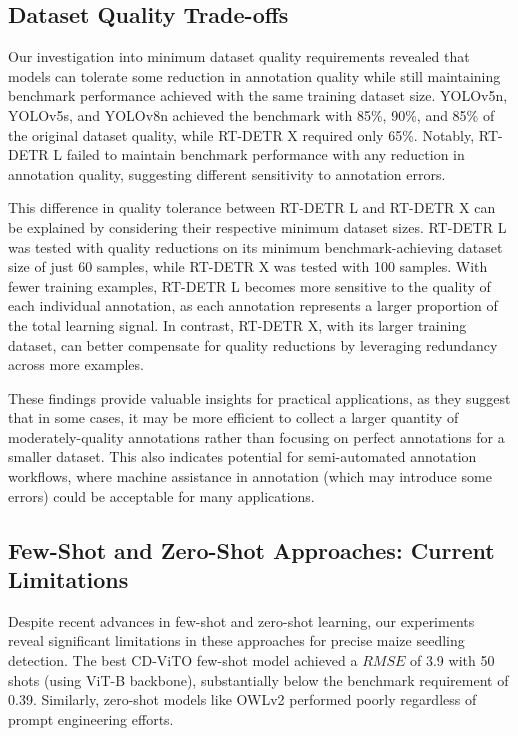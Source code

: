 \documentclass[12pt,a4paper,oneside]{report}
\begin{document}
\subsection{Dataset Quality Trade-offs}
Our investigation into minimum dataset quality requirements revealed that models can tolerate some reduction 
in annotation quality while still maintaining benchmark performance achieved with the
same training dataset size. YOLOv5n, YOLOv5s, and YOLOv8n achieved 
the benchmark with 85\%, 90\%, and 85\% of the original dataset quality, while RT-DETR X required 
only 65\%. Notably, RT-DETR L failed to maintain benchmark performance with any reduction in annotation quality, 
suggesting different sensitivity to annotation errors.

This difference in quality tolerance between RT-DETR L and RT-DETR X can be explained by considering their 
respective minimum dataset sizes. RT-DETR L was tested with quality reductions on its minimum benchmark-achieving 
dataset size of just 60 samples, while RT-DETR X was tested with 100 samples. With fewer training examples, 
RT-DETR L becomes more sensitive to the quality of each individual annotation, as each annotation represents 
a larger proportion of the total learning signal. In contrast, RT-DETR X, with its larger training dataset, 
can better compensate for quality reductions by leveraging redundancy across more examples.

These findings provide valuable insights for practical applications, as they suggest that in some 
cases, it may be more efficient to collect a larger quantity of moderately-quality annotations 
rather than focusing on perfect annotations for a smaller dataset. This also indicates potential 
for semi-automated annotation workflows, where machine assistance in annotation (which may introduce 
some errors) could be acceptable for many applications.

\subsection{Few-Shot and Zero-Shot Approaches: Current Limitations}
Despite recent advances in few-shot and zero-shot learning, our experiments reveal significant 
limitations in these approaches for precise maize seedling detection. The best CD-ViTO few-shot 
model achieved a $RMSE$ of 3.9 with 50 shots (using ViT-B backbone), substantially below the benchmark 
requirement of 0.39. Similarly, zero-shot models like OWLv2 performed poorly regardless of prompt 
engineering efforts.
\end{document}
